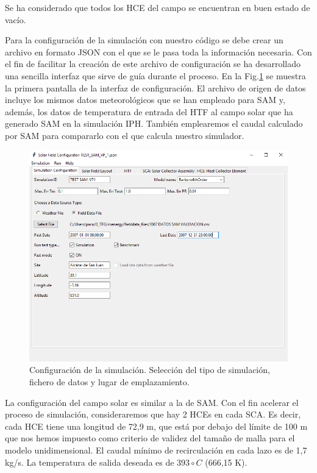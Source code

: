 Se ha considerado que todos los HCE  del campo se encuentran en buen estado de vacío.

Para la configuración de la simulación con nuestro código se debe crear un archivo en formato JSON con el que se le pasa toda la información necesaria. Con el fin de facilitar la creación de este archivo de configuración se ha desarrollado una sencilla interfaz que sirve de guía durante el proceso. En la Fig.\ref{fig:interface01} se muestra la primera pantalla de la interfaz de configuración. El archivo de origen de datos incluye los mismos datos meteorológicos que se han empleado para SAM y, además, los datos de temperatura de entrada del HTF al campo solar que ha generado SAM en la simulación IPH. También emplearemos el caudal calculado por SAM para compararlo con el que calcula nuestro simulador.

\begin{figure}
\includegraphics[width=0.9\linewidth]{images/interface01.png}
\caption{Configuración de la simulación. Selección del tipo de simulación, fichero de datos y lugar de emplazamiento.} 
\label{fig:interface01}
\end{figure}

La configuración del campo solar es similar a la de SAM. Con el fin acelerar el proceso de simulación, consideraremos que hay 2 HCEs en cada SCA. Es decir, cada HCE tiene una longitud de 72,9 m, que está por debajo del límite de 100 m que nos hemos impuesto como criterio de validez del tamaño de malla para el modelo unidimensional.  El caudal mínimo de recirculación en cada lazo es de 1,7 kg/s. La temperatura de salida deseada es de $393\circ C$ (666,15 K).

